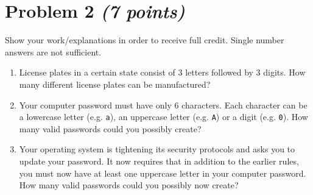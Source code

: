 \documentclass[11pt,twoside]{article}
\newcommand{\pts}[1]{\marginpar{ \small\hspace{0pt} \textit{[#1]} } }
\numberwithin{equation}{section}
\newcommand{\?}{\stackrel{?}{=}}
\begin{document}
  

\eject  
\section*{Problem 2 \textit{(7 points)}}
Show your work/explanations in order to receive full credit.
Single number answers are not sufficient.

\begin{enumerate}[\bf (a)]

\item
    License plates in a certain state consist of 3 letters followed by 3 digits.\pts{2}
    How many different license plates can be manufactured?
    \vspace{16ex}
    
\item
  Your computer password must have only 6 characters.\pts{2} Each character can be a lowercase letter (e.g. \texttt{a}), an uppercase letter (e.g.
  \texttt{A}) or a digit (e.g. \texttt{0}). How many valid passwords could you possibly create?

  \vspace{17ex}
  
\item Your operating system is tightening its security protocols and asks you to update your password. \pts{3}
  It now requires that in addition to the earlier rules, you must now have at least one uppercase letter in your computer password.
  How many valid passwords could you possibly now create?


\vspace{20ex}
  
\end{enumerate}



  
\end{document}
